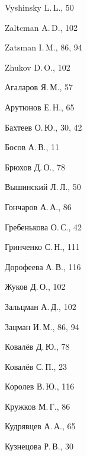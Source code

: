 \begin{theindex}
  \indexspace

  \item Vyshinsky L.\,L., 50

  \indexspace

  \item Zaltcman A.\,D., 102
  \item Zatsman I.\,M., 86, 94
  \item Zhukov D.\,O., 102


\newpage

  \indexspace

  \item Агаларов Я.\,М., 57
  \item Арутюнов Е.\,Н., 65

  \indexspace

  \item Бахтеев О.\,Ю., 30, 42
  \item Босов А.\,В., 11
  \item Брюхов Д.\,О., 78

  \indexspace

  \item Вышинский Л.\,Л., 50

  \indexspace

  \item Гончаров А.\,А., 86
  \item Гребенькова О.\,С., 42
  \item Гринченко С.\,Н., 111

  \indexspace

  \item Дорофеева А.\,В., 116

  \indexspace

  \item Жуков Д.\,О., 102

  \indexspace

  \item Зальцман А.\,Д., 102
  \item Зацман И.\,М., 86, 94

  \indexspace

  \item Ковалёв Д.\,Ю., 78
  \item Ковалёв С.\,П., 23
  \item Королев В.\,Ю., 116
  \item Кружков М.\,Г., 86
  \item Кудрявцев А.\,А., 65
  \item Кузнецова Р.\,В., 30


\end{theindex}
